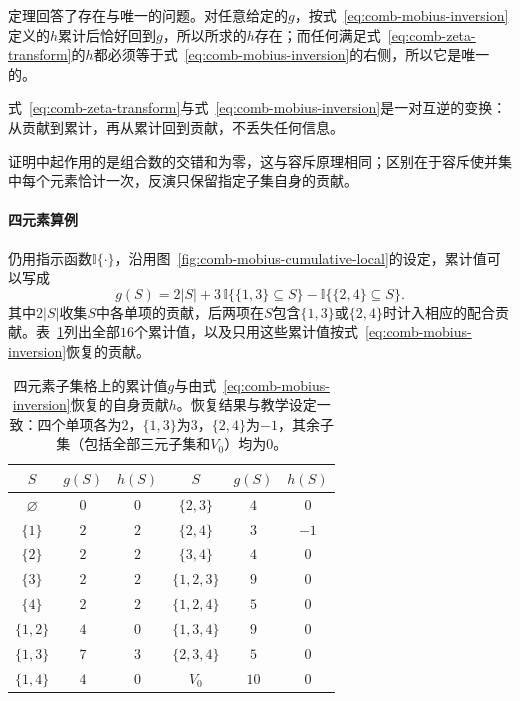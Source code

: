 定理回答了存在与唯一的问题。对任意给定的$g$，按式~\eqref{eq:comb-mobius-inversion}定义的$h$累计后恰好回到$g$，所以所求的$h$存在；而任何满足式~\eqref{eq:comb-zeta-transform}的$h$都必须等于式~\eqref{eq:comb-mobius-inversion}的右侧，所以它是唯一的。

式~\eqref{eq:comb-zeta-transform}与式~\eqref{eq:comb-mobius-inversion}是一对互逆的变换：从贡献到累计，再从累计回到贡献，不丢失任何信息。

证明中起作用的是组合数的交错和为零，这与容斥原理相同；区别在于容斥使并集中每个元素恰计一次，反演只保留指定子集自身的贡献。

\paragraph{四元素算例}
仍用指示函数$\mathbb I\{\cdot\}$，沿用图~\ref{fig:comb-mobius-cumulative-local}的设定，累计值可以写成
\[
  g(S)=2|S|+3\,\mathbb I\{\{1,3\}\subseteq S\}-\mathbb I\{\{2,4\}\subseteq S\}.
\]
其中$2|S|$收集$S$中各单项的贡献，后两项在$S$包含$\{1,3\}$或$\{2,4\}$时计入相应的配合贡献。表~\ref{tab:comb-four-element-mobius}列出全部$16$个累计值，以及只用这些累计值按式~\eqref{eq:comb-mobius-inversion}恢复的贡献。

\begin{table}[!htb]
  \centering
  \begin{tabular}{ccc@{\qquad}ccc}
    \toprule
    $S$ & $g(S)$ & $h(S)$ & $S$ & $g(S)$ & $h(S)$ \\
    \midrule
    $\varnothing$ & $0$ & $0$ & $\{2,3\}$ & $4$ & $0$ \\
    $\{1\}$ & $2$ & $2$ & $\{2,4\}$ & $3$ & $-1$ \\
    $\{2\}$ & $2$ & $2$ & $\{3,4\}$ & $4$ & $0$ \\
    $\{3\}$ & $2$ & $2$ & $\{1,2,3\}$ & $9$ & $0$ \\
    $\{4\}$ & $2$ & $2$ & $\{1,2,4\}$ & $5$ & $0$ \\
    $\{1,2\}$ & $4$ & $0$ & $\{1,3,4\}$ & $9$ & $0$ \\
    $\{1,3\}$ & $7$ & $3$ & $\{2,3,4\}$ & $5$ & $0$ \\
    $\{1,4\}$ & $4$ & $0$ & $V_0$ & $10$ & $0$ \\
    \bottomrule
  \end{tabular}
  \caption{四元素子集格上的累计值$g$与由式~\eqref{eq:comb-mobius-inversion}恢复的自身贡献$h$。恢复结果与教学设定一致：四个单项各为$2$，$\{1,3\}$为$3$，$\{2,4\}$为$-1$，其余子集（包括全部三元子集和$V_0$）均为$0$。}
  \label{tab:comb-four-element-mobius}
\end{table}

